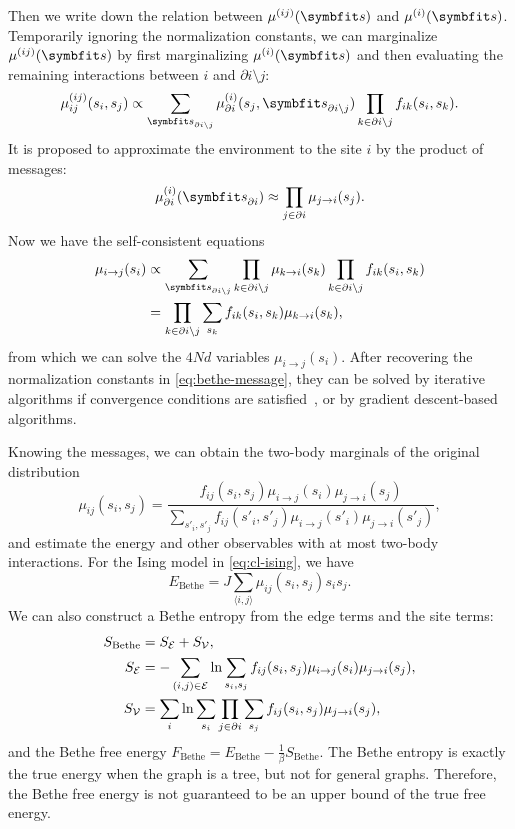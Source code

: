 Then we write down the relation between $\mu^{(i j)}(\vs)$ and $\mu^{(i)}(\vs)$. Temporarily ignoring the normalization constants, we can marginalize $\mu^{(i j)}(\vs)$ by first marginalizing $\mu^{(i)}(\vs)$ and then evaluating the remaining interactions between $i$ and $\partial i \setminus j$:
\begin{equation}
\mu^{(i j)}_{i j}(s_i, s_j) \propto \sum_{\vs_{\partial i \setminus j}} \mu^{(i)}_{\partial i}(s_j, \vs_{\partial i \setminus j}) \prod_{k \in \partial i \setminus j} f_{i k}(s_i, s_k).
\end{equation}
It is proposed to approximate the environment to the site $i$ by the product of messages:
\begin{equation}
\mu^{(i)}_{\partial i}(\vs_{\partial i}) \approx \prod_{j \in \partial i} \mu_{j \to i}(s_j).
\label{eq:bethe-prob}
\end{equation}
Now we have the self-consistent equations
\begin{align}
\mu_{i \to j}(s_i) &\propto \sum_{\vs_{\partial i \setminus j}} \prod_{k \in \partial i \setminus j} \mu_{k \to i}(s_k) \prod_{k \in \partial i \setminus j} f_{i k}(s_i, s_k) \\
&= \prod_{k \in \partial i \setminus j} \sum_{s_k} f_{i k}(s_i, s_k) \mu_{k \to i}(s_k),
\label{eq:bethe-message}
\end{align}
from which we can solve the $4 N d$ variables $\mu_{i \to j}(s_i)$. After recovering the normalization constants in \cref{eq:bethe-message}, they can be solved by iterative algorithms if convergence conditions are satisfied~\cite{mooij2007sufficient}, or by gradient descent-based algorithms.

Knowing the messages, we can obtain the two-body marginals of the original distribution
\begin{equation}
\mu_{i j}(s_i, s_j) = \frac{f_{i j}(s_i, s_j) \mu_{i \to j}(s_i) \mu_{j \to i}(s_j)}{\sum_{s'_i, s'_j} f_{i j}(s'_i, s'_j) \mu_{i \to j}(s'_i) \mu_{j \to i}(s'_j)},
\end{equation}
and estimate the energy and other observables with at most two-body interactions. For the Ising model in \cref{eq:cl-ising}, we have
\begin{equation}
E_\text{Bethe} = J \sum_{\langle i, j \rangle} \mu_{i j}(s_i, s_j) s_i s_j.
\end{equation}
We can also construct a Bethe entropy from the edge terms and the site terms:
\begin{align}
S_\text{Bethe} &= S_{\mathcal{E}} + S_{\mathcal{V}}, \\
S_{\mathcal{E}} &= -\sum_{(i, j) \in \mathcal{E}} \ln \sum_{s_i, s_j} f_{i j}(s_i, s_j) \mu_{i \to j}(s_i) \mu_{j \to i}(s_j), \\
S_{\mathcal{V}} &= \sum_i \ln \sum_{s_i} \prod_{j \in \partial i} \sum_{s_j} f_{i j}(s_i, s_j) \mu_{j \to i}(s_j),
\end{align}
and the Bethe free energy $F_\text{Bethe} = E_\text{Bethe} - \frac{1}{\beta} S_\text{Bethe}$. The Bethe entropy is exactly the true energy when the graph is a tree, but not for general graphs. Therefore, the Bethe free energy is not guaranteed to be an upper bound of the true free energy.


